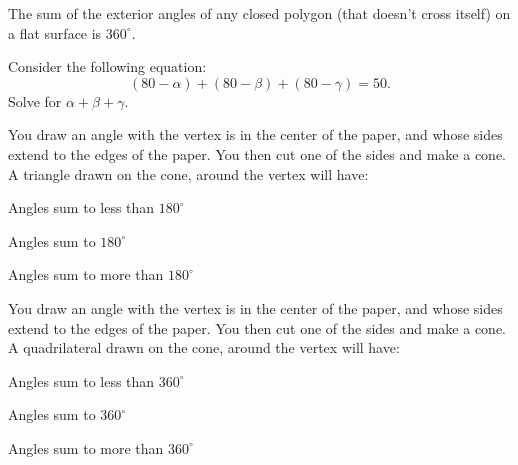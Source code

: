 \documentclass[noauthor,nooutcomes]{ximera}
\author{Claire Merriman \and Bart Snapp}
\begin{document}
\maketitle

\begin{exercise}
 The sum of the exterior angles of any closed polygon (that doesn't
 cross itself) on a flat surface is $360^\circ$.
\end{exercise}

\begin{exercise}
 Consider the following equation:
 \[
 (80-\alpha)+(80-\beta)+(80-\gamma)=50.
 \]
 Solve for $\alpha+\beta+\gamma$.
\end{exercise}






\begin{exercise}
 You draw an angle with the vertex is in the center of the paper, and
 whose sides extend to the edges of the paper. You then cut one of the
 sides and make a cone. A triangle drawn on the cone, around the
 vertex will have:
 
\begin{enumerate}
\begin{multicols}{3}
 \item Angles sum to less than $180^\circ$
 \item Angles sum to $180^\circ$
 \item Angles sum to more than $180^\circ$
\end{multicols}
\end{enumerate}
\end{exercise}


\begin{exercise}
 You draw an angle with the vertex is in the center of the paper, and
 whose sides extend to the edges of the paper. You then cut one of the
 sides and make a cone. A quadrilateral drawn on the cone, around the
 vertex will have:
 
\begin{enumerate}
\begin{multicols}{3}
 \item Angles sum to less than $360^\circ$
 \item Angles sum to $360^\circ$
 \item Angles sum to more than $360^\circ$
\end{multicols}
\end{enumerate}
\end{exercise}
\end{document}
